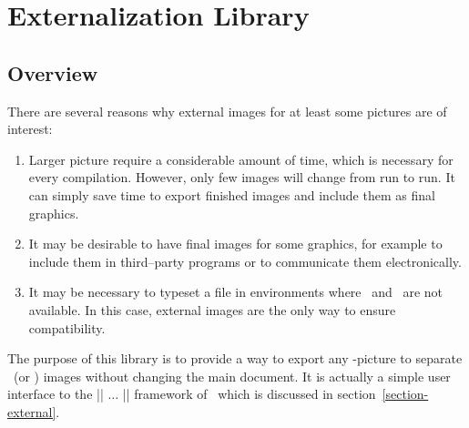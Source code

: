 %
%
%


\section{Externalization Library}
\label{section-libs-external}

{
{}



\subsection{Overview}

There are several reasons why external images for at least some pictures are of
interest:
%
\begin{enumerate}
    \item Larger picture require a considerable amount of time, which is
        necessary for every compilation. However, only few images will change
        from run to run. It can simply save time to export finished images and
        include them as final graphics.
    \item It may be desirable to have final images for some graphics, for
        example to include them in third--party programs or to communicate them
        electronically.
    \item It may be necessary to typeset a file in environments where \pgfname\
        and \tikzname\ are not available. In this case, external images are the
        only way to ensure compatibility.
\end{enumerate}
%
The purpose of this library is to provide a way to export any \tikzname-picture
to separate \pdf\ (or \eps) images without changing the main document. It is
actually a simple user interface to the |\beginpgfgraphicnamed| $\dotsc$
|\endpgfgraphicnamed| framework of \pgfname\ which is discussed in
section~\ref{section-external}.


}
